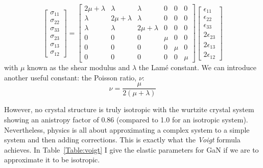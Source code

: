 \begin{enumerate}
\begin{equation}
\begin{bmatrix}
\sigma_{11}\\
\sigma_{22}\\
\sigma_{33}\\
\sigma_{23}\\
\sigma_{13}\\
\sigma_{12}
\end{bmatrix}
=
\begin{bmatrix}
2\mu+\lambda  &  \lambda       &  \lambda       &  0 & 0 & 0\\
\lambda       &  2\mu+\lambda  &  \lambda       &  0 & 0 & 0\\
\lambda       &       \lambda  &  2\mu+\lambda  &  0 & 0 & 0\\
 0            &       0        &  0             &\mu & 0 & 0\\
 0            &       0        &  0             &0   &\mu& 0\\
 0            &       0        &  0             &0   & 0 & \mu
\end{bmatrix}
%
\begin{bmatrix}
\epsilon_{11}\\
\epsilon_{22}\\
\epsilon_{33}\\
2\epsilon_{23}\\
2\epsilon_{13}\\
2\epsilon_{12}
\end{bmatrix}
\end{equation}
with $\mu$ known as the shear modulus and $\lambda$ the Lam\'{e} constant. We can introduce another useful constant: the Poisson ratio, $\nu$:
\begin{equation*}
 \nu = \frac{\mu}{2(\mu + \lambda )}   
\end{equation*}

\end{enumerate}
However, no crystal structure is truly isotropic with the wurtzite crystal system showing an anistropy factor of 0.86 (compared to 1.0 for an isotropic system). Nevertheless, physics is all about approximating a complex system to a simple system and then adding corrections. This is exactly what the \textit{Voigt} formula~\cite{Hirthbook} achieves. In Table~\ref{Table:voigt} I give the elastic parameters for GaN if we are to approximate it to be isotropic. 


